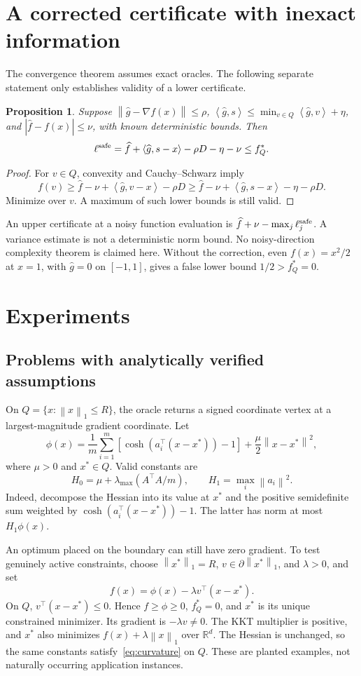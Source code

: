 \documentclass[11pt]{article}
\newtheorem{proposition}[theorem]{Proposition}
\newcommand{\norm}[1]{\left\|#1\right\|}
\newcommand{\inner}[2]{\left\langle#1,#2\right\rangle}
\newcommand{\R}{\mathbb R}
\begin{document}
\section{A corrected certificate with inexact information}
The convergence theorem assumes exact oracles. The following separate
statement only establishes validity of a lower certificate.

\begin{proposition}\label{prop:noise}
Suppose $\norm{\widehat g-\nabla f(x)}\le\rho$,
$\inner{\widehat g}{s}\le\min_{v\in Q}\inner{\widehat g}{v}+\eta$,
and $|\widehat f-f(x)|\le\nu$, with known deterministic bounds.
Then
\[
 \ell^{\rm safe}=\widehat f+\inner{\widehat g}{s-x}
                     -\rho D-\eta-\nu\le f_Q^*.
\]
\end{proposition}
\begin{proof}
For $v\in Q$, convexity and Cauchy--Schwarz imply
\[
 f(v)\ge\widehat f-\nu+\inner{\widehat g}{v-x}-\rho D
      \ge\widehat f-\nu+\inner{\widehat g}{s-x}-\eta-\rho D.
\]
Minimize over $v$. A maximum of such lower bounds is still valid.
\end{proof}
An upper certificate at a noisy function evaluation is
$\widehat f+\nu-\max_j\ell_j^{\rm safe}$. A variance estimate is not
a deterministic norm bound. No noisy-direction complexity theorem is
claimed here. Without the correction, even $f(x)=x^2/2$ at $x=1$,
with $\widehat g=0$ on $[-1,1]$, gives a false lower bound $1/2>f_Q^*=0$.

\section{Experiments}
\subsection{Problems with analytically verified assumptions}
On $Q=\{x:\norm x_1\le R\}$, the oracle returns a signed coordinate
vertex at a largest-magnitude gradient coordinate. Let
\[
 \phi(x)=\frac1m\sum_{i=1}^m[\cosh(a_i^\top(x-x^*))-1]
                        +\frac\mu2\norm{x-x^*}^2,
\]
where $\mu>0$ and $x^*\in Q$. Valid constants are
\[
 H_0=\mu+\lambda_{\max}(A^\top A/m),\qquad
 H_1=\max_i\norm{a_i}^2.
\]
Indeed, decompose the Hessian into its value at $x^*$ and the positive
semidefinite sum weighted by $\cosh(a_i^\top(x-x^*))-1$.
The latter has norm at most $H_1\phi(x)$.

An optimum placed on the boundary can still have zero gradient.
To test genuinely active constraints, choose $\norm{x^*}_1=R$,
$v\in\partial\norm{x^*}_1$, and $\lambda>0$, and set
\begin{equation}\label{eq:active}
 f(x)=\phi(x)-\lambda v^\top(x-x^*).
\end{equation}
On $Q$, $v^\top(x-x^*)\le0$. Hence $f\ge\phi\ge0$, $f_Q^*=0$,
and $x^*$ is its unique constrained minimizer. Its gradient is
$-\lambda v\ne0$. The KKT multiplier is positive, and $x^*$ also
minimizes $f(x)+\lambda\norm x_1$ over $\R^d$. The Hessian is unchanged,
so the same constants satisfy~\eqref{eq:curvature} on $Q$.
These are planted examples, not naturally occurring application instances.
\end{document}
